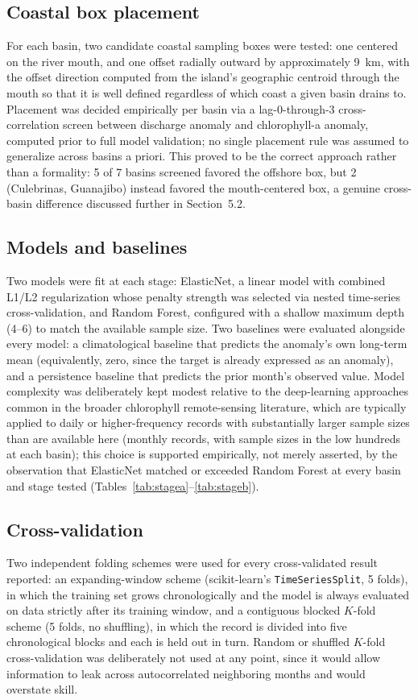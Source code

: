 \documentclass[preprint,12pt]{elsarticle}
\begin{document}
\subsection{Coastal box placement}
For each basin, two candidate coastal sampling boxes were tested: one centered on the river mouth, and one offset radially outward by approximately 9~km, with the offset direction computed from the island's geographic centroid through the mouth so that it is well defined regardless of which coast a given basin drains to. Placement was decided empirically per basin via a lag-0-through-3 cross-correlation screen between discharge anomaly and chlorophyll-a anomaly, computed prior to full model validation; no single placement rule was assumed to generalize across basins a priori. This proved to be the correct approach rather than a formality: 5 of 7 basins screened favored the offshore box, but 2 (Culebrinas, Guanajibo) instead favored the mouth-centered box, a genuine cross-basin difference discussed further in Section~5.2.

\subsection{Models and baselines}
Two models were fit at each stage: ElasticNet, a linear model with combined L1/L2 regularization whose penalty strength was selected via nested time-series cross-validation, and Random Forest, configured with a shallow maximum depth (4--6) to match the available sample size. Two baselines were evaluated alongside every model: a climatological baseline that predicts the anomaly's own long-term mean (equivalently, zero, since the target is already expressed as an anomaly), and a persistence baseline that predicts the prior month's observed value. Model complexity was deliberately kept modest relative to the deep-learning approaches common in the broader chlorophyll remote-sensing literature, which are typically applied to daily or higher-frequency records with substantially larger sample sizes than are available here (monthly records, with sample sizes in the low hundreds at each basin); this choice is supported empirically, not merely asserted, by the observation that ElasticNet matched or exceeded Random Forest at every basin and stage tested (Tables~\ref{tab:stagea}--\ref{tab:stageb}).

\subsection{Cross-validation}
Two independent folding schemes were used for every cross-validated result reported: an expanding-window scheme (scikit-learn's \texttt{TimeSeriesSplit}, 5 folds), in which the training set grows chronologically and the model is always evaluated on data strictly after its training window, and a contiguous blocked $K$-fold scheme (5 folds, no shuffling), in which the record is divided into five chronological blocks and each is held out in turn. Random or shuffled $K$-fold cross-validation was deliberately not used at any point, since it would allow information to leak across autocorrelated neighboring months and would overstate skill.
\end{document}
